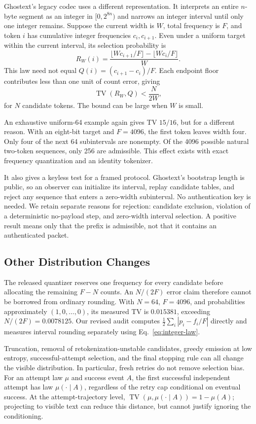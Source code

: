 Ghostext's legacy codec uses a different representation. It interprets an entire
$n$-byte segment as an integer in $[0,2^{8n})$ and narrows an integer interval
until only one integer remains. Suppose the current width is $W$, total
frequency is $F$, and token $i$ has cumulative integer frequencies $c_i,c_{i+1}$.
Even under a uniform target within the current interval, its selection
probability is
\begin{equation}
 R_W(i)=\frac{\lfloor Wc_{i+1}/F\rfloor-\lfloor Wc_i/F\rfloor}{W}.
 \label{eq:integer-law}
\end{equation}
This law need not equal $Q(i)=(c_{i+1}-c_i)/F$. Each endpoint floor contributes
less than one unit of count error, giving
\begin{equation}
 \operatorname{TV}(R_W,Q)<\frac{N}{2W},
 \label{eq:local-rounding}
\end{equation}
for $N$ candidate tokens. The bound can be large when $W$ is small.

An exhaustive uniform-64 example again gives TV $15/16$, but for a different
reason. With an eight-bit target and $F=4096$, the first token leaves width four.
Only four of the next 64 subintervals are nonempty. Of the 4096 possible natural
two-token sequences, only 256 are admissible. This effect exists with exact
frequency quantization and an identity tokenizer.

It also gives a keyless test for a framed protocol. Ghostext's bootstrap length
is public, so an observer can initialize its interval, replay candidate tables,
and reject any sequence that enters a zero-width subinterval. No authentication
key is needed. We retain separate reasons for rejection: candidate exclusion,
violation of a deterministic no-payload step, and zero-width interval selection.
A positive result means only that the prefix is admissible, not that it contains
an authenticated packet.

\subsection{Other Distribution Changes}

The released quantizer reserves one frequency for every candidate before
allocating the remaining $F-N$ counts. An $N/(2F)$ error claim therefore cannot
be borrowed from ordinary rounding. With $N=64$, $F=4096$, and probabilities
approximately $(1,0,\ldots,0)$, its measured TV is $0.015381$, exceeding
$N/(2F)=0.0078125$. Our revised audit computes
$\frac12\sum_i|p_i-f_i/F|$ directly and measures interval rounding separately
using Eq.~\eqref{eq:integer-law}.

Truncation, removal of retokenization-unstable candidates, greedy emission at
low entropy, successful-attempt selection, and the final stopping rule can all
change the visible distribution. In particular, fresh retries do not remove
selection bias. For an attempt law $\mu$ and success event $A$, the first
successful independent attempt has law $\mu(\cdot\mid A)$, regardless of the
retry cap conditional on eventual success. At the attempt-trajectory level,
$\operatorname{TV}(\mu,\mu(\cdot\mid A))=1-\mu(A)$; projecting to visible text
can reduce this distance, but cannot justify ignoring the conditioning.
